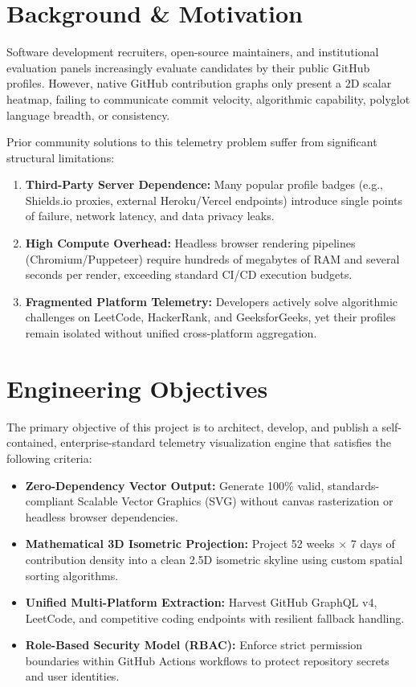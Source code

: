 \documentclass[12pt,a4paper]{report}
\begin{document}
\section{Background \& Motivation}
Software development recruiters, open-source maintainers, and institutional evaluation panels increasingly evaluate candidates by their public GitHub profiles. However, native GitHub contribution graphs only present a 2D scalar heatmap, failing to communicate commit velocity, algorithmic capability, polyglot language breadth, or consistency.

Prior community solutions to this telemetry problem suffer from significant structural limitations:
\begin{enumerate}
    \item \textbf{Third-Party Server Dependence:} Many popular profile badges (e.g., Shields.io proxies, external Heroku/Vercel endpoints) introduce single points of failure, network latency, and data privacy leaks.
    \item \textbf{High Compute Overhead:} Headless browser rendering pipelines (Chromium/Puppeteer) require hundreds of megabytes of RAM and several seconds per render, exceeding standard CI/CD execution budgets.
    \item \textbf{Fragmented Platform Telemetry:} Developers actively solve algorithmic challenges on LeetCode, HackerRank, and GeeksforGeeks, yet their profiles remain isolated without unified cross-platform aggregation.
\end{enumerate}

\section{Engineering Objectives}
The primary objective of this project is to architect, develop, and publish a self-contained, enterprise-standard telemetry visualization engine that satisfies the following criteria:
\begin{itemize}
    \item \textbf{Zero-Dependency Vector Output:} Generate 100\% valid, standards-compliant Scalable Vector Graphics (SVG) without canvas rasterization or headless browser dependencies.
    \item \textbf{Mathematical 3D Isometric Projection:} Project 52 weeks $\times$ 7 days of contribution density into a clean 2.5D isometric skyline using custom spatial sorting algorithms.
    \item \textbf{Unified Multi-Platform Extraction:} Harvest GitHub GraphQL v4, LeetCode, and competitive coding endpoints with resilient fallback handling.
    \item \textbf{Role-Based Security Model (RBAC):} Enforce strict permission boundaries within GitHub Actions workflows to protect repository secrets and user identities.
\end{itemize}
\end{document}
